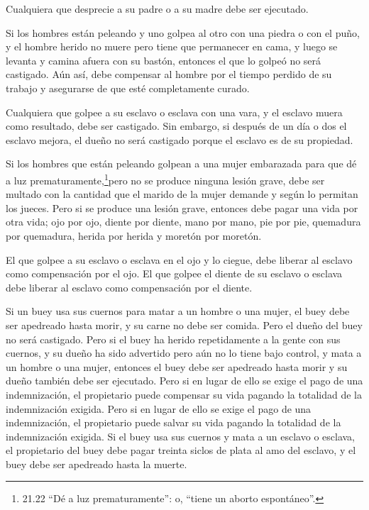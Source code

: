  Cualquiera que desprecie a su padre o a su madre debe ser
ejecutado.

 Si los hombres están peleando y uno golpea al otro con una
piedra o con el puño, y el hombre herido no muere pero tiene que
permanecer en cama,  y luego se levanta y camina afuera con
su bastón, entonces el que lo golpeó no será castigado. Aún así, debe
compensar al hombre por el tiempo perdido de su trabajo y asegurarse de
que esté completamente curado.

 Cualquiera que golpee a su esclavo o esclava con una vara,
y el esclavo muera como resultado, debe ser castigado.  Sin
embargo, si después de un día o dos el esclavo mejora, el dueño no será
castigado porque el esclavo es de su propiedad.

 Si los hombres que están peleando golpean a una mujer
embarazada para que dé a luz prematuramente,\footnote{21.22 ``Dé a luz
  prematuramente'': o, ``tiene un aborto espontáneo''.}pero no se
produce ninguna lesión grave, debe ser multado con la cantidad que el
marido de la mujer demande y según lo permitan los jueces. 
Pero si se produce una lesión grave, entonces debe pagar una vida por
otra vida;  ojo por ojo, diente por diente, mano por mano,
pie por pie,  quemadura por quemadura, herida por herida y
moretón por moretón.

 El que golpee a su esclavo o esclava en el ojo y lo
ciegue, debe liberar al esclavo como compensación por el ojo.
 El que golpee el diente de su esclavo o esclava debe
liberar al esclavo como compensación por el diente.

 Si un buey usa sus cuernos para matar a un hombre o una
mujer, el buey debe ser apedreado hasta morir, y su carne no debe ser
comida. Pero el dueño del buey no será castigado.  Pero si
el buey ha herido repetidamente a la gente con sus cuernos, y su dueño
ha sido advertido pero aún no lo tiene bajo control, y mata a un hombre
o una mujer, entonces el buey debe ser apedreado hasta morir y su dueño
también debe ser ejecutado.  Pero si en lugar de ello se
exige el pago de una indemnización, el propietario puede compensar su
vida pagando la totalidad de la indemnización exigida. 
Pero si en lugar de ello se exige el pago de una indemnización, el
propietario puede salvar su vida pagando la totalidad de la
indemnización exigida.  Si el buey usa sus cuernos y mata a
un esclavo o esclava, el propietario del buey debe pagar treinta siclos
de plata al amo del esclavo, y el buey debe ser apedreado hasta la
muerte.

